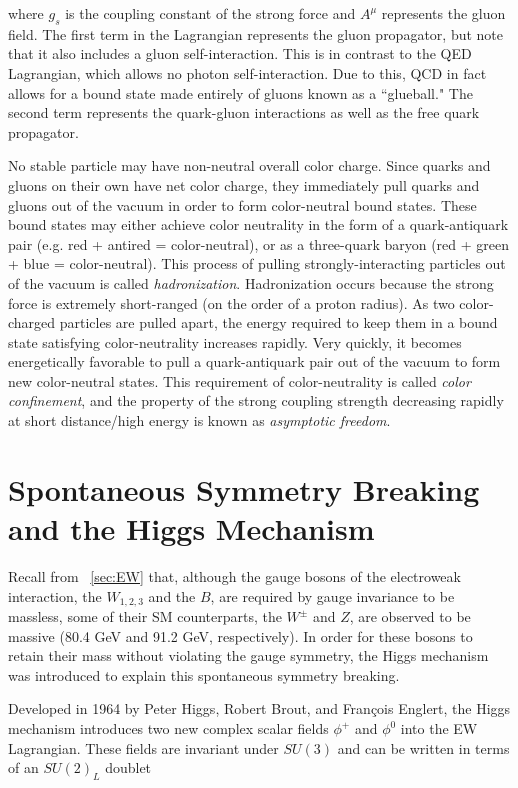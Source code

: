 \noindent where $g_{s}$ is the coupling constant of the strong force and $A^{\mu}$ represents the gluon field. The first term in the Lagrangian represents the gluon propagator, but note that it also includes a gluon self-interaction. This is in contrast to the QED Lagrangian, which allows no photon self-interaction. Due to this, QCD in fact allows for a bound state made entirely of gluons known as a ``glueball." The second term represents the quark-gluon interactions as well as the free quark propagator.

No stable particle may have non-neutral overall color charge. Since quarks and gluons on their own have net color charge, they immediately pull quarks and gluons out of the vacuum in order to form color-neutral bound states. These bound states may either achieve color neutrality in the form of a quark-antiquark pair (e.g. red + antired = color-neutral), or as a three-quark baryon (red + green + blue = color-neutral). This process of pulling strongly-interacting particles out of the vacuum is called \textit{hadronization}. Hadronization occurs because the strong force is extremely short-ranged (on the order of a proton radius). As two color-charged particles are pulled apart, the energy required to keep them in a bound state satisfying color-neutrality increases rapidly. Very quickly, it becomes energetically favorable to pull a quark-antiquark pair out of the vacuum to form new color-neutral states. This requirement of color-neutrality is called \textit{color confinement}, and the property of the strong coupling strength decreasing rapidly at short distance/high energy is known as \textit{asymptotic freedom}\cite{halzen}.


\section{Spontaneous Symmetry Breaking and the Higgs Mechanism}

Recall from ~\ref{sec:EW} that, although the gauge bosons of the electroweak interaction, the $W_{1,2,3}$ and the $B$, are required by gauge invariance to be massless, some of their SM counterparts, the $W^{\pm}$ and $Z$, are observed to be massive (80.4 GeV and 91.2 GeV, respectively). In order for these bosons to retain their mass without violating the gauge symmetry, the Higgs mechanism was introduced to explain this spontaneous symmetry breaking.

Developed in 1964 by Peter Higgs, Robert Brout, and Fran\c{c}ois Englert, the Higgs mechanism introduces two new complex scalar fields $\phi^{+}$ and $\phi^0$ into the EW Lagrangian. These fields are invariant under $SU(3)$ and can be written in terms of an $SU(2)_L$ doublet 

